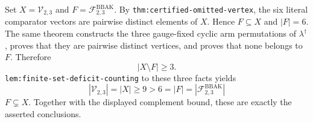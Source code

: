 Set \(X=\mathcal V_{2,3}\) and \(F=\mathcal F^{\mathrm{BBAK}}_{2,3}\). By \texttt{thm:certified-omitted-vertex}, the six literal comparator vectors are pairwise distinct elements of \(X\). Hence \(F\subseteq X\) and \(|F|=6\). The same theorem constructs the three gauge-fixed cyclic arm permutations of \(\lambda^\dagger\), proves that they are pairwise distinct vertices, and proves that none belongs to \(F\). Therefore\n\[\left|X\setminus F\right|\ge 3.\]\nApplying \texttt{lem:finite-set-deficit-counting} to these three facts yields\n\[|\mathcal V_{2,3}|=|X|\ge 9>6=|F|=|\mathcal F^{\mathrm{BBAK}}_{2,3}|\]\nand \(F\subsetneq X\). Together with the displayed complement bound, these are exactly the asserted conclusions.